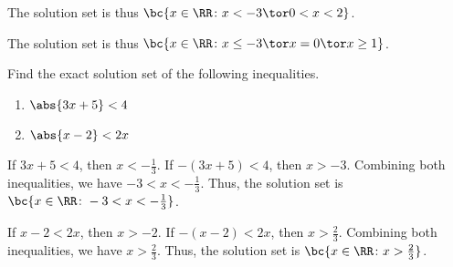 \begin{solution}
\begin{ppart}
\begin{center}
\begin{tikzpicture}
            \end{tikzpicture}
        \end{center}
        The solution set is thus $\bc{x \in \RR \colon x < -3 \tor 0 < x < 2}$.
    \end{ppart}
    \begin{ppart}
        \begin{center}
        \end{center}
        The solution set is thus $\bc{x \in \RR \colon x \leq -3 \tor x = 0 \tor x \geq 1}$.
    \end{ppart}
\end{solution}

\begin{problem}
    Find the exact solution set of the following inequalities.

    \begin{enumerate}
        \item $\abs{3x+5} < 4$
        \item $\abs{x-2} < 2x$
    \end{enumerate}
\end{problem}
\begin{solution}
    \begin{ppart}
        If $3x + 5 < 4$, then $x < -\frac13$. If $-(3x+5) < 4$, then $x > -3$. Combining both inequalities, we have $-3 < x < -\frac13$. Thus, the solution set is $\bc{x \in \RR \colon -3 < x< -\frac13}$.
    \end{ppart}
    \begin{ppart}
        If $x - 2 < 2x$, then $x > -2$. If $-(x-2) < 2x$, then $x > \frac23$. Combining both inequalities, we have $x > \frac23$. Thus, the solution set is $\bc{x \in \RR \colon x > \frac23}$.
    \end{ppart}
\end{solution}

